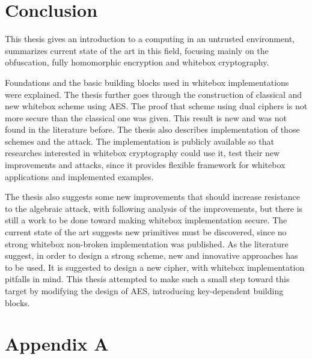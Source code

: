 \documentclass[11pt,oneside,final]{fithesis2}
\begin{document}
\chapter{Conclusion}\label{sec:conclusion}   
    This thesis gives an introduction to a computing in an untrusted environment, summarizes current state of the art in this field, focusing 
    mainly on the obfuscation, fully homomorphic encryption and whitebox cryptography.
    
    Foundations and the basic building blocks used in whitebox implementations were explained. The thesis further goes through 
    the construction of classical and new whitebox scheme using AES. The proof that scheme using dual ciphers is not more secure than the classical one 
    was given. This result is new and was not found in the literature before. The thesis also describes implementation of those schemes and 
    the attack. The implementation is publicly available so that researches interested in whitebox cryptography could use it, test their new improvements and
    attacks, since it provides flexible framework for whitebox applications and implemented examples.
    
    The thesis also suggests some new improvements that should increase resistance to the algebraic attack, with following analysis of the improvements, but
    there is still a work to be done toward making whitebox implementation secure. The current state of the art suggests new primitives must be discovered, since
    no strong whitebox non-broken implementation was published. As the literature \citep{Billet:2004:CWB:2080787.2080809, wyseurPhd} suggest, in order 
    to design a strong scheme, new and innovative approaches has to be used. It is suggested to design a new cipher, with whitebox implementation pitfalls in mind.
    This thesis attempted to make such a small step toward this target by modifying the design of AES, introducing key-dependent building blocks.
    
\appendix

\chapter{Appendix A}
\end{document}
